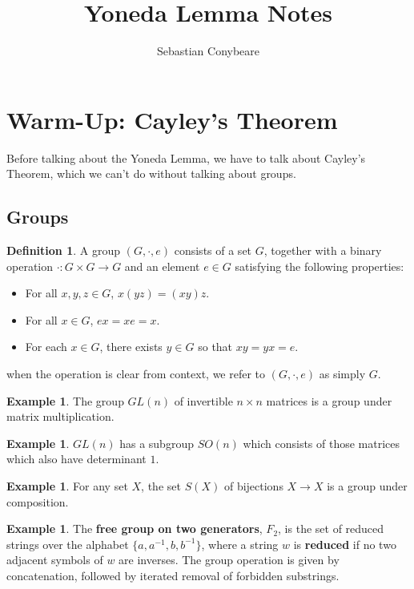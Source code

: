\documentclass[11pt]{article}
\theoremstyle{plain}
\theoremstyle{definition}
\newtheorem{exmp}[thm]{Example}
\newtheorem{defn}[thm]{Definition}
\begin{document}
\author{Sebastian Conybeare}
\title{Yoneda Lemma Notes}
\maketitle

\section{Warm-Up: Cayley's Theorem}
Before talking about the Yoneda Lemma, we have to talk about Cayley's Theorem, which we can't do without talking about groups.

\subsection{Groups}

\begin{defn}
    A group $(G,\cdot,e)$ consists of a set $G$, together with a binary operation $\cdot : G \times G \to G$ and an element $e \in G$ satisfying the following properties:
    \begin{itemize}
        \item
            For all $x,y,z \in G$, $x(yz) = (xy)z$.
        \item
            For all $x \in G$, $ex = xe = x$.
        \item
            For each $x \in G$, there exists $y \in G$ so that $xy = yx = e$.
    \end{itemize}
\end{defn}
when the operation is clear from context, we refer to $(G,\cdot,e)$ as simply $G$.

\begin{exmp}
    The group $GL(n)$ of invertible $n \times n$ matrices is a group under matrix multiplication.
\end{exmp}

\begin{exmp}
    $GL(n)$ has a subgroup $SO(n)$ which consists of those matrices which also have determinant $1$.
\end{exmp}

\begin{exmp}
    For any set $X$, the set $S(X)$ of bijections $X \to X$ is a group under composition.
\end{exmp}

\begin{exmp}
    The \textbf{free group on two generators}, $F_2$, is the set of reduced strings over the alphabet $\{a,a^{-1},b,b^{-1}\}$, where a string $w$ is \textbf{reduced} if no two adjacent symbols of $w$ are inverses. The group operation is given by concatenation, followed by iterated removal of forbidden substrings.
\end{exmp}
\end{document}
